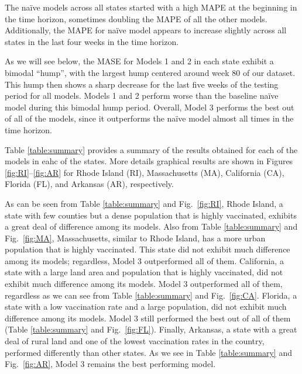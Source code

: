 The na\"ive models across all states started with a high {MAPE} at the beginning in the time horizon, sometimes doubling the {MAPE} of all the other models. Additionally, the {MAPE} for na\"ive model appears to increase slightly across all states in the last four weeks in the time horizon.

As we will see below, the {MASE} for Models 1 and 2 in each state exhibit a bimodal ``hump'', with the largest hump centered around week 80 of our dataset. This hump then shows a sharp decrease for the last five weeks of the testing period for all models. Models 1 and 2 perform worse than the baseline na\"ive model during this bimodal hump period. 
Overall, Model 3 performs the best out of all of the models, since it outperforms the na\"ive model almost all times in the time horizon. %

Table \ref{table:summary} provides a summary of the results obtained for each of the models in eahc of the states. More details graphical results are shown in Figures \ref{fig:RI}--\ref{fig:AR} for Rhode Island (RI), Massachusetts (MA), California (CA), Florida (FL), and Arkansas (AR), respectively. 


As can be seen from Table \ref{table:summary} and Fig.~\ref{fig:RI}, Rhode Island, a state with few counties but a dense population that is highly vaccinated, exhibits a great deal of difference among its models. Also from Table \ref{table:summary} and Fig.~\ref{fig:MA}, Massachusetts, similar to Rhode Island, has a more urban population that is highly vaccinated. This state did not exhibit much difference among its models; regardless, Model 3 outperformed all of them. California, a state with a large land area and population that is highly vaccinated, did not exhibit much difference among its models. Model 3 outperformed all of them, regardless as we can see from Table \ref{table:summary} and Fig.~\ref{fig:CA}. Florida, a state with a low vaccination rate and a large population, did not exhibit much difference among its models. Model 3 still performed the best out of all of them (Table \ref{table:summary} and Fig.~\ref{fig:FL}). Finally, Arkansas, a state with a great deal of rural land and one of the lowest vaccination rates in the country, performed differently than other states. As we see in Table \ref{table:summary} and Fig.~\ref{fig:AR}, Model 3 remains the best performing model.

